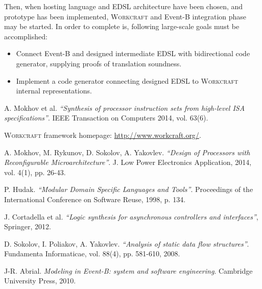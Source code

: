 \documentclass[12pt, a4paper]{article}
\begin{document}
Then, when hosting language and EDSL architecture have been chosen, 
and prototype has been implemented, \textsc{Workcraft} and Event-B integration 
phase may be started. In order to complete is, following large-scale goals
must be accomplished:

\begin{itemize} 
\item Connect Event-B and designed intermediate EDSL with bidirectional code
generator, supplying proofs of translation soundness.
\item Implement a code generator connecting designed EDSL to \textsc{Workcraft}
internal representations.
\end{itemize}

\begin{thebibliography}{7}

A. Mokhov et al.
\emph{``Synthesis of processor instruction sets from high-level ISA specifications''}. IEEE Transaction on Computers 2014, vol. 63(6).

    \textsc{Workcraft} framework homepage: \url{http://www.workcraft.org/}.

  A. Mokhov, M. Rykunov, D. Sokolov, A. Yakovlev.
  \emph{``Design of Processors with Reconfigurable Microarchitecture''}.
  J. Low Power Electronics Application, 2014, vol. 4(1), pp. 26-43.

  P. Hudak.
  \emph{``Modular Domain Specific Languages and Tools''}.
  Proceedings of the International Conference on Software Reuse, 1998, p. 134.

J. Cortadella et al. \emph{``Logic synthesis for asynchronous controllers and interfaces''}, Springer, 2012.

  D. Sokolov, I. Poliakov, A. Yakovlev. \emph{``Analysis of static data flow structures''}. Fundamenta Informaticae, vol. 88(4), pp. 581-610, 2008.

  J-R. Abrial. \emph{Modeling in Event-B: system and software engineering}. Cambridge University Press, 2010.

\end{thebibliography}
\end{document}
